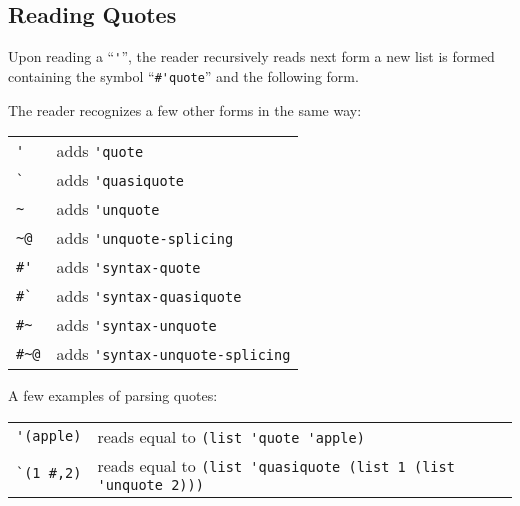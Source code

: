\subsection{Reading Quotes}
\label{subsec:aml-base-lang-reader-quotes}

Upon reading a ``\lstinline!'!'', the reader recursively reads next form a new list is formed containing the symbol ``\lstinline!#'quote!'' and the following form. 

The reader recognizes a few other forms in the same way:

\begin{tabular}{ l l }
  \lstinline!'! & adds \lstinline!'quote! \\
  \lstinline!`! & adds \lstinline!'quasiquote! \\
  \lstinline!~! & adds \lstinline!'unquote! \\
  \lstinline!~@! & adds \lstinline!'unquote-splicing! \\
  \lstinline!#'! & adds \lstinline!'syntax-quote! \\
  \lstinline!#`! & adds \lstinline!'syntax-quasiquote! \\
  \lstinline!#~! & adds \lstinline!'syntax-unquote! \\
  \lstinline!#~@! & adds \lstinline!'syntax-unquote-splicing! \\
\end{tabular}

\example A few examples of parsing quotes:

\begin{tabular}{ r l }
  \lstinline!'(apple)! & reads equal to \lstinline!(list 'quote 'apple)! \\
  \lstinline!`(1 #,2)! & reads equal to \lstinline!(list 'quasiquote (list 1 (list 'unquote 2)))! \\
\end{tabular}






